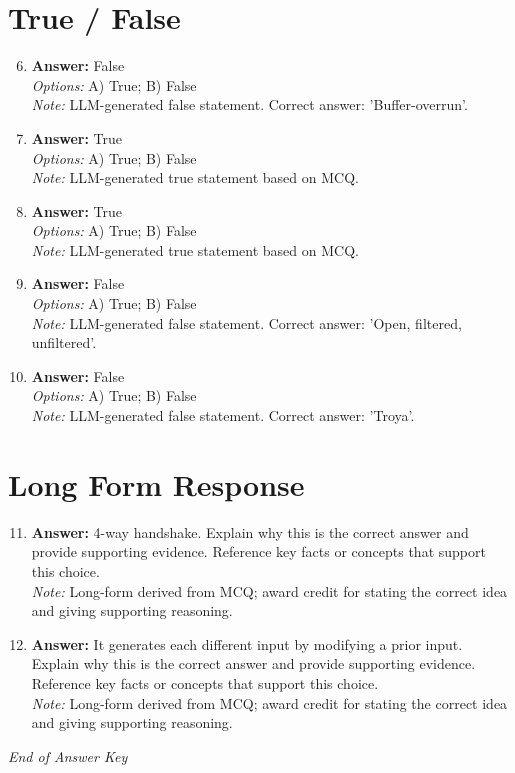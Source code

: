 \documentclass[12pt]{article}
\begin{document}
\section*{True / False}
\begin{enumerate}[label=\arabic*.]
\setcounter{enumi}{5}
\item \textbf{Answer:} False
\\ \textit{Options:} A) True; B) False
\\ \textit{Note:} LLM-generated false statement. Correct answer: 'Buffer-overrun'.
\item \textbf{Answer:} True
\\ \textit{Options:} A) True; B) False
\\ \textit{Note:} LLM-generated true statement based on MCQ.
\item \textbf{Answer:} True
\\ \textit{Options:} A) True; B) False
\\ \textit{Note:} LLM-generated true statement based on MCQ.
\item \textbf{Answer:} False
\\ \textit{Options:} A) True; B) False
\\ \textit{Note:} LLM-generated false statement. Correct answer: 'Open, filtered, unfiltered'.
\item \textbf{Answer:} False
\\ \textit{Options:} A) True; B) False
\\ \textit{Note:} LLM-generated false statement. Correct answer: 'Troya'.
\end{enumerate}

\section*{Long Form Response}
\begin{enumerate}[label=\arabic*.]
\setcounter{enumi}{10}
\item \textbf{Answer:} 4-way handshake. Explain why this is the correct answer and provide supporting evidence. Reference key facts or concepts that support this choice.
\\ \textit{Note:} Long-form derived from MCQ; award credit for stating the correct idea and giving supporting reasoning.
\item \textbf{Answer:} It generates each different input by modifying a prior input. Explain why this is the correct answer and provide supporting evidence. Reference key facts or concepts that support this choice.
\\ \textit{Note:} Long-form derived from MCQ; award credit for stating the correct idea and giving supporting reasoning.
\end{enumerate}

\vfill
\noindent\textit{End of Answer Key}
\end{document}
